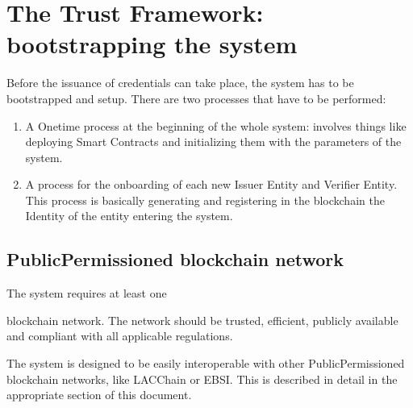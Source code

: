 \documentclass[a4paper,12pt,english,openany]{sphinxmanual}
\begin{document}
\section{The Trust Framework: bootstrapping the system}
\label{\detokenize{privacycred:the-trust-framework-bootstrapping-the-system}}
\sphinxAtStartPar
Before the issuance of credentials can take place, the system has to be bootstrapped and setup. There are two processes that have to be performed:
\begin{enumerate}
%
\item {} 
\sphinxAtStartPar
A One\sphinxhyphen{}time process at the beginning of the whole system: involves things like deploying Smart Contracts and initializing them with the parameters of the system.

\item {} 
\sphinxAtStartPar
A process for the onboarding of each new Issuer Entity and Verifier Entity. This process is basically generating and registering in the blockchain the Identity of the entity entering the system.

\end{enumerate}


\subsection{Public\sphinxhyphen{}Permissioned blockchain network}
\label{\detokenize{privacycred:public-permissioned-blockchain-network}}
\sphinxAtStartPar
The system requires at least one %
\begin{footnote}[1]\sphinxAtStartFootnote
{}
%
\end{footnote} blockchain network. The network should be trusted, efficient, publicly available and compliant with all applicable regulations.

\sphinxAtStartPar
The system is designed to be easily interoperable with other Public\sphinxhyphen{}Permissioned blockchain networks, like LACChain or EBSI. This is described in detail in the appropriate section of this document.
\end{document}
